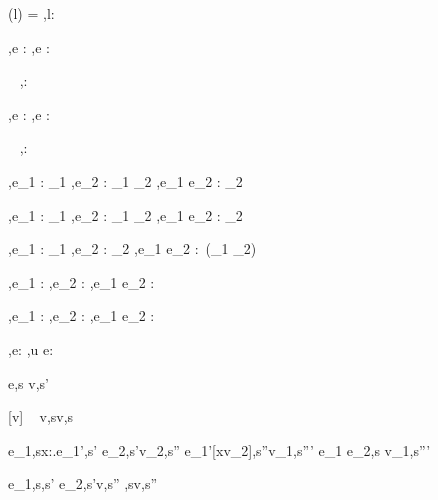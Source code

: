   {\Sigma(l) = \tau}
  {\Gamma,\Sigma\infers l:\Reference \tau}


  {\Gamma,\Sigma \infers e : \tau}
  {\Gamma,\Sigma \infers \Edit e : \Task \tau}

  {\ }
  {\Gamma,\Sigma \infers \Enter \tau : \Task \tau}

  {\Gamma,\Sigma \infers e : \Reference \tau}
  {\Gamma,\Sigma \infers \Update e : \Task \tau}


  {\ }
  {\Gamma,\Sigma \infers \Fail : \Task \tau}


  {
    {\Gamma,\Sigma \infers e_1 : \Task \tau_1}
    {\Gamma,\Sigma \infers e_2 : \tau_1 \to \Task \tau_2}}
  {\Gamma,\Sigma \infers e_1 \Then e_2 : \Task \tau_2}


  {
    {\Gamma,\Sigma \infers e_1 : \Task \tau_1}
    {\Gamma,\Sigma \infers e_2 : \tau_1 \to \Task \tau_2}}
  {\Gamma,\Sigma \infers e_1 \Next e_2 : \Task \tau_2}


  {\Gamma,\Sigma \infers e_1 : \Task \tau_1  \Quad
   \Gamma,\Sigma \infers e_2 : \Task \tau_2}
  {\Gamma,\Sigma \infers e_1 \And e_2 : \Task\,(\tau_1 \times \tau_2)}


  {
    {\Gamma,\Sigma \infers e_1 : \Task \tau}
    {\Gamma,\Sigma \infers e_2 : \Task \tau}}
  {\Gamma,\Sigma \infers e_1 \Or e_2 : \Task \tau}


  {
    {\Gamma,\Sigma \infers e_1 : \Task \tau}
    {\Gamma,\Sigma \infers e_2 : \Task \tau}}
  {\Gamma,\Sigma \infers e_1 \Xor e_2 : \Task \tau}


  {\Gamma,\Sigma\infers e:\Task\tau}
  {\Gamma,\Sigma\infers u \At e:\Task\tau}





  {e,s \evaluate v,s'}


[v\in{}]
  {\ }
  {v,s\evaluate v,s}

  {
    {
     {e_1,s\evaluate \lambda x:\tau.e_1',s'}
    {e_2,s'\evaluate v_2,s''}}
    {e_1'[x\mapsto v_2],s''\evaluate v_1,s'''}
    }
  {e_1 e_2,s \evaluate v_1,s'''}


    {e_1,s\evaluate \True,s' \Quad
     e_2,s'\evaluate v,s''}
    {,s\evaluate v,s''}

